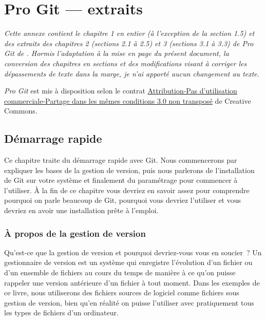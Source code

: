 \chapter{Pro Git --- extraits}
\label{chap:git}

\begingroup \itshape%
Cette annexe contient le chapitre 1 en entier (à l'exception de la
section 1.5) et des extraits des chapitres 2 (sections 2.1 à 2.5) et 3
(sections 3.1 à 3.3) de \emph{Pro Git} de \citet{ProGit:2e:2014}.
Hormis l'adaptation à la mise en page du présent document, la
conversion des chapitres en sections et des modifications visant à
corriger les dépassements de texte dans la marge, je n'ai apporté
aucun changement au texte.

\emph{Pro Git} est mis à disposition selon le contrat
\href{http://creativecommons.org/licenses/by-sa/4.0/deed.fr}{%
  Attribution-Pas d’utilisation commerciale-Partage dans les mêmes
  conditions 3.0 non transposé} de Creative Commons.
\endgroup

\section{Démarrage rapide}
\label{sec:git:getting_started}

Ce chapitre traite du démarrage rapide avec Git.
Nous commencerons par expliquer les bases de la gestion de version, puis nous parlerons de l'installation de Git sur votre système et finalement du paramétrage pour commencer à l'utiliser.
À la fin de ce chapitre vous devriez en savoir assez pour comprendre pourquoi on parle beaucoup de Git, pourquoi vous devriez l'utiliser et vous devriez en avoir une installation prête à l'emploi.

\subsection{À propos de la gestion de version}

Qu'est-ce que la gestion de version et pourquoi devriez-vous vous en soucier ?
Un gestionnaire de version est un système qui enregistre l'évolution d'un fichier ou d'un ensemble de fichiers au cours du temps de manière à ce qu'on puisse rappeler une version antérieure d'un fichier à tout moment.
Dans les exemples de ce livre, nous utiliserons des fichiers sources de logiciel comme fichiers sous gestion de version, bien qu'en réalité on puisse l'utiliser avec pratiquement tous les types de fichiers d'un ordinateur.

